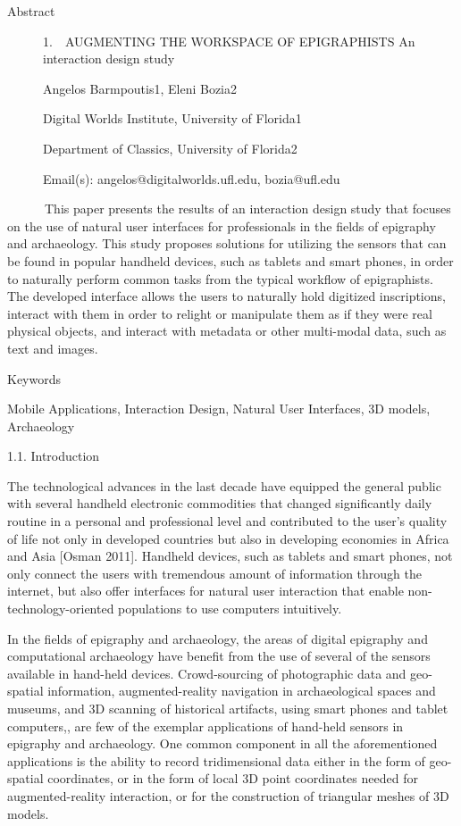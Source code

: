 \documentclass[amsthm,ebook]{saparticle}
\title{}
\author{Angelos}
\date{2015-11-21}
\begin{document}
Abstract

\begin{figure}
\centering
\begin{minipage}{10.901cm}
1.\ \ AUGMENTING THE WORKSPACE OF EPIGRAPHISTS\newline
An interaction design study\newline


Angelos Barmpoutis1, Eleni Bozia2

Digital Worlds Institute, University of Florida1 

Department of Classics, University of Florida2

Email(s): angelos@digitalworlds.ufl.edu, bozia@ufl.edu
\end{minipage}
\end{figure}
\ \ \ \ \ \ This paper presents the results of an interaction design study that focuses on the use of natural user
interfaces for professionals in the fields of epigraphy and archaeology. This study proposes solutions for utilizing
the sensors that can be found in popular handheld devices, such as tablets and smart phones, in order to naturally
perform common tasks from the typical workflow of epigraphists. The developed interface allows the users to naturally
hold digitized inscriptions, interact with them in order to relight or manipulate them as if they were real physical
objects, and interact with metadata or other multi-modal data, such as text and images. 

Keywords

Mobile Applications, Interaction Design, Natural User Interfaces, 3D models, Archaeology

1.1. Introduction

The technological advances in the last decade have equipped the general public with several handheld electronic
commodities that changed significantly daily routine in a personal and professional level and contributed to the user's
quality of life not only in developed countries but also in developing economies in Africa and Asia [Osman 2011].
Handheld devices, such as tablets and smart phones, not only connect the users with tremendous amount of information
through the internet, but also offer interfaces for natural user interaction that enable non-technology-oriented
populations to use computers intuitively.

In the fields of epigraphy and archaeology, the areas of digital epigraphy and computational archaeology have benefit
from the use of several of the sensors available in hand-held devices. Crowd-sourcing of photographic data and
geo-spatial information, augmented-reality navigation in archaeological spaces and museums, and 3D scanning of
historical artifacts, using smart phones and tablet computers,, are few of the exemplar applications of hand-held
sensors in epigraphy and archaeology. One common component in all the aforementioned applications is the ability to
record tridimensional data either in the form of geo-spatial coordinates, or in the form of local 3D point coordinates
needed for augmented-reality interaction, or for the construction of triangular meshes of 3D models. \ 
\end{document}
